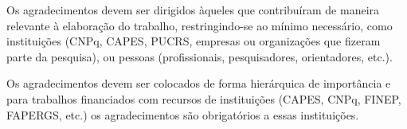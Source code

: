\begin{agradecimentos}
  Os agradecimentos devem ser dirigidos àqueles que contribuíram de maneira
relevante à elaboração do trabalho, restringindo-se ao mínimo necessário, como
instituições (CNPq, CAPES, PUCRS, empresas ou organizações que fizeram parte
da pesquisa), ou pessoas (profissionais, pesquisadores, orientadores, etc.).

Os agradecimentos devem ser colocados de forma hierárquica de importância
e para trabalhos financiados com recursos de instituições (CAPES, CNPq, FINEP,
FAPERGS, etc.) os agradecimentos são obrigatórios a essas instituições.
\vfill
\end{agradecimentos}
